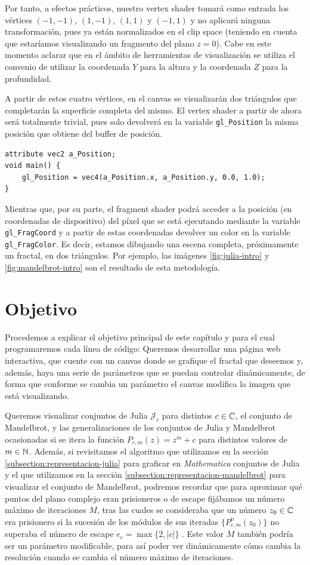 Por tanto, a efectos prácticos, nuestro vertex shader tomará como entrada los vértices $(-1,-1)$, $(1,-1)$, $(1,1)$ y $(-1,1)$ y no aplicará ninguna transformación, pues ya están normalizados en el clip space (teniendo en cuenta que estaríamos visualizando un fragmento del plano $z=0$). Cabe en este momento aclarar que en el ámbito de herramientas de visualización se utiliza el convenio de utilizar la coordenada $Y$ para la altura y la coordenada $Z$ para la profundidad. 

A partir de estos cuatro vértices, en el canvas se visualizarán dos triángulos que completarán la superficie completa del mismo. El vertex shader a partir de ahora será totalmente trivial, pues solo devolverá en la variable \verb|gl_Position| la misma posición que obtiene del buffer de posición.

\begin{lstlisting}
attribute vec2 a_Position;
void main() {
    gl_Position = vec4(a_Position.x, a_Position.y, 0.0, 1.0);
}
\end{lstlisting}

Mientras que, por su parte, el fragment shader podrá acceder a la posición (en coordenadas de dispositivo) del píxel que se está ejecutando mediante la variable \verb|gl_FragCoord| y a partir de estas coordenadas devolver un color en la variable \verb|gl_FragColor|. Es decir, estamos dibujando una escena completa, próximamente un fractal, en dos triángulos. Por ejemplo, las imágenes \ref{fig:julia-intro} y \ref{fig:mandelbrot-intro} son el resultado de esta metodología. 

\section{Objetivo}

Procedemos a explicar el objetivo principal de este capítulo y para el cual programaremos cada línea de código: Queremos desarrollar una página web interactiva, que cuente con un canvas donde se grafique el fractal que deseemos y, además, haya una serie de parámetros que se puedan controlar dinámicamente, de forma que conforme se cambia un parámetro el canvas modifica la imagen que está visualizando.

Queremos visualizar conjuntos de Julia $\mathcal{J}_c$ para distintos $c\in\mathbb{C}$, el conjunto de Mandelbrot, y las generalizaciones de los conjuntos de Julia y Mandelbrot ocasionadas si se itera la función $P_{c,m}(z)=z^m+c$ para distintos valores de $m\in\mathbb{N}$. Además, si revisitamos el algoritmo que utilizamos en la sección \ref{subsection:representacion-julia} para graficar en \textit{Mathematica} conjuntos de Julia y el que utilizamos en la sección \ref{subsection:representacion-mandelbrot} para visualizar el conjunto de Mandelbrot, podremos recordar que para aproximar qué puntos del plano complejo eran prisioneros o de escape fijábamos un número máximo de iteraciones $M$, tras las cuales se consideraba que un número $z_0\in\mathbb{C}$ era prisionero si la sucesión de los módulos de sus iteradas $\{P_{c,m}^n(z_0)\}$ no superaba el número de escape $e_c=\max\{2,|c|\}$ . Este valor $M$ también podría ser un parámetro modificable, para así poder ver dinámicamente cómo cambia la resolución cuando se cambia el número máximo de iteraciones.

